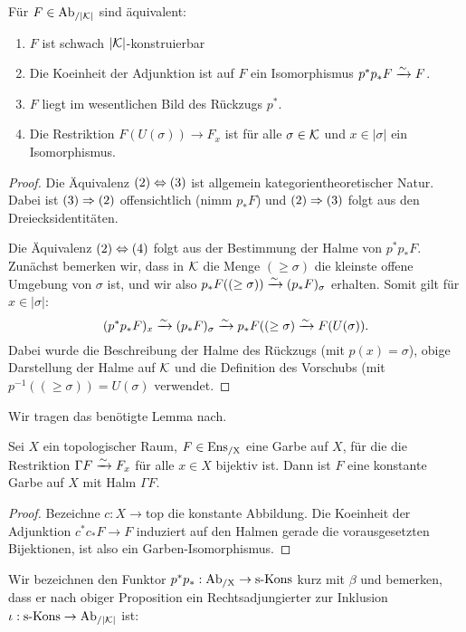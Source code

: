 \begin{prop}[\cite{WS}]
  Für $F \in \operatorname{Ab}_{/|\mathcal{K}|}$ sind äquivalent:
  \begin{enumerate}
  \item $F$ ist schwach $|\mathcal{K}|$-konstruierbar
  \item Die Koeinheit der Adjunktion ist auf $F$ ein Isomorphismus
    $p^*p_*F \xrightarrow{\sim} F$.
  \item $F$ liegt im wesentlichen Bild des Rückzugs $p^*$.
  \item Die Restriktion $F(U(\sigma)) \to F_x$ ist für alle $\sigma
    \in \mathcal{K}$ und $x \in |\sigma|$ ein Isomorphismus.
  \end{enumerate}
\end{prop}
\begin{proof}
  Die Äquivalenz $(2) \Leftrightarrow (3)$ ist allgemein kategorientheoretischer
  Natur. Dabei ist $(3) \Rightarrow (2)$ offensichtlich (nimm $p_* F$)
  und $(2) \Rightarrow (3)$ folgt aus den Dreiecksidentitäten.

  Die Äquivalenz $(2) \Leftrightarrow (4)$ folgt aus der Bestimmung der Halme von
  $p^*p_* F$. Zunächst bemerken wir, dass in $\mathcal{K}$ die Menge $(\geq
  \sigma)$ die kleinste offene Umgebung von $\sigma$ ist, und wir also
  $p_*F((\geq \sigma)) \xrightarrow{\sim} (p_*F)_{\sigma}$ erhalten. Somit gilt für
  $x \in |\sigma|$:
  \[ (p^*p_*F)_x \xrightarrow{\sim} (p_*F)_{\sigma} \xrightarrow{\sim} p_*F((\geq \sigma) \xrightarrow{\sim} F(U(\sigma)). \]
  Dabei wurde die Beschreibung der Halme des Rückzugs (mit $p(x) =
  \sigma$), obige Darstellung der Halme auf $\mathcal{K}$ und die Definition
  des Vorschubs (mit $p^{-1}((\geq \sigma)) = U(\sigma)$ verwendet.

\end{proof}

Wir tragen das benötigte Lemma nach.

\begin{lemma}[\cite{TG}, 2.1.41]
  Sei $X$ ein topologischer Raum, $F \in \operatorname{Ens_{/X}}$ eine Garbe auf $X$,
  für die die Restriktion $\Gamma F \xrightarrow{\sim} F_x$ für alle $x \in X$
  bijektiv ist. Dann ist $F$ eine konstante Garbe auf $X$ mit Halm
  $\Gamma F$.
\end{lemma}
\begin{proof}
  Bezeichne $c: X \to \mathrm{top}$ die konstante Abbildung. Die
  Koeinheit der Adjunktion $c^* c_* F \to F$ induziert auf den Halmen
  gerade die vorausgesetzten Bijektionen, ist also ein
  Garben-Isomorphismus.
\end{proof}

Wir bezeichnen den Funktor $p^*p_*: \operatorname{Ab_{/X}} \to \operatorname{s-Kons}$ kurz mit $\beta$
und bemerken, dass er nach obiger Proposition ein Rechtsadjungierter
zur Inklusion $\iota: \operatorname{s-Kons} \to \operatorname{Ab}_{/|\mathcal{K}|}$ ist:

